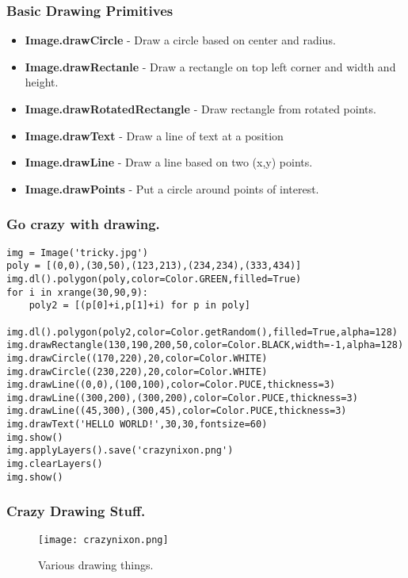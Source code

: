 \documentclass[compress]{beamer}
\begin{document}
\begin{frame}
\frametitle{Basic Drawing Primitives}
\begin{itemize}
  \item \textbf{Image.drawCircle} - Draw a circle based on center and radius.
  \item \textbf{Image.drawRectanle} - Draw a rectangle on top left
    corner and width and height.
  \item \textbf{Image.drawRotatedRectangle} - Draw rectangle from
    rotated points.
  \item \textbf{Image.drawText} - Draw a line of text at a position
  \item \textbf{Image.drawLine} - Draw a line based on two (x,y) points.
  \item \textbf{Image.drawPoints} - Put a circle around points of
    interest. 
\end{itemize}
\end{frame}
\begin{frame}[fragile] 
\frametitle{Go crazy with drawing.}
\begin{example}
\begin{verbatim}
img = Image('tricky.jpg')
poly = [(0,0),(30,50),(123,213),(234,234),(333,434)]
img.dl().polygon(poly,color=Color.GREEN,filled=True)
for i in xrange(30,90,9):
    poly2 = [(p[0]+i,p[1]+i) for p in poly]
    img.dl().polygon(poly2,color=Color.getRandom(),filled=True,alpha=128)
img.drawRectangle(130,190,200,50,color=Color.BLACK,width=-1,alpha=128)
img.drawCircle((170,220),20,color=Color.WHITE)
img.drawCircle((230,220),20,color=Color.WHITE)
img.drawLine((0,0),(100,100),color=Color.PUCE,thickness=3)
img.drawLine((300,200),(300,200),color=Color.PUCE,thickness=3)
img.drawLine((45,300),(300,45),color=Color.PUCE,thickness=3)
img.drawText('HELLO WORLD!',30,30,fontsize=60)
img.show()
img.applyLayers().save('crazynixon.png')
img.clearLayers()
img.show()
\end{verbatim}
\end{example}
\end{frame}
\begin{frame}
\frametitle{Crazy Drawing Stuff.}
 \begin{figure}
     \texttt{[image: crazynixon.png]}
     \caption{Various drawing things.}
 \end{figure}
\end{frame}
\end{document}
